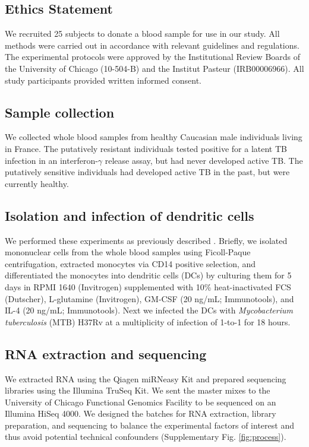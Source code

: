 \documentclass[fleqn,10pt]{wlscirep}
\begin{document}
\subsection*{Ethics Statement}

We recruited 25 subjects to donate a blood sample for use in our
study. All methods were carried out in accordance with relevant
guidelines and regulations. The experimental protocols were approved
by the Institutional Review Boards of the University of Chicago
(10-504-B) and the Institut Pasteur (IRB00006966). All study
participants provided written informed consent.
\subsection*{Sample collection}

We collected whole blood samples from healthy Caucasian male
individuals living in France. The putatively resistant individuals
tested positive for a latent TB infection in an interferon-$\gamma$
release assay, but had never developed active TB. The putatively
sensitive individuals had developed active TB in the past, but were
currently healthy.
\subsection*{Isolation and infection of dendritic cells}

We performed these experiments as previously described
\cite{Barreiro2012}. Briefly, we isolated mononuclear cells from the
whole blood samples using Ficoll-Paque centrifugation, extracted
monocytes via CD14 positive selection, and differentiated the
monocytes into dendritic cells (DCs) by culturing them for 5 days in
RPMI 1640 (Invitrogen) supplemented with 10\% heat-inactivated FCS
(Dutscher), L-glutamine (Invitrogen), GM-CSF (20 ng/mL; Immunotools),
and IL-4 (20 ng/mL; Immunotools). Next we infected the DCs with
\emph{Mycobacterium tuberculosis} (MTB) H37Rv at a multiplicity of
infection of 1-to-1 for 18 hours.
\subsection*{RNA extraction and sequencing}

We extracted RNA using the Qiagen miRNeasy Kit and prepared sequencing
libraries using the Illumina TruSeq Kit. We sent the master mixes to
the University of Chicago Functional Genomics Facility to be sequenced
on an Illumina HiSeq 4000. We designed the batches for RNA extraction,
library preparation, and sequencing to balance the experimental
factors of interest and thus avoid potential technical confounders
(Supplementary Fig. \ref{fig:process}).
\end{document}
